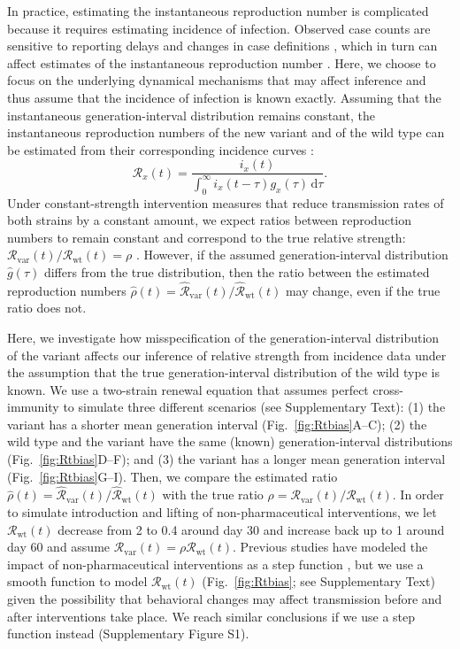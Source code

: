 \documentclass[12pt]{article}
\newcommand{\fref}[1]{Fig.~\ref{fig:#1}}
\newcommand{\vvvar}{\mathrm{var}}
\newcommand{\wwwt}{\mathrm{wt}}
\newcommand{\Rx}[1]{\ensuremath{{\mathcal R}_{#1}}\xspace}
\newcommand{\RR}{\ensuremath{{\mathcal R}}\xspace}
\newcommand{\Rw}{\Rx{\wwwt}}
\newcommand{\Rv}{\Rx{\vvvar}}
\newcommand{\dd}[1]{\ensuremath{\, \mathrm{d}#1}}
\newcommand{\dtau}{\dd{\tau}}
\begin{document}
In practice, estimating the instantaneous reproduction number is complicated because it requires estimating incidence of infection.
Observed case counts are sensitive to reporting delays \citep{goldstein2009reconstructing} and changes in case definitions \citep{tsang2020effect}, which in turn can affect estimates of the instantaneous reproduction number \citep{gostic2020practical}.
Here, we choose to focus on the underlying dynamical mechanisms that may affect inference and thus assume that the incidence of infection is known exactly.
Assuming that the instantaneous generation-interval distribution remains constant, the instantaneous reproduction numbers of the new variant and of the wild type can be estimated from their corresponding incidence curves \cite{cori2013new}:
\begin{equation}
\RR_x(t) = \frac{i_x(t)}{\int_0^\infty i_x(t-\tau) g_x(\tau) \dtau}.
\label{eq:rt}
\end{equation}
Under constant-strength intervention measures that reduce transmission rates of both strains by a constant amount, we expect ratios between reproduction numbers to remain constant and correspond to the true relative strength: $\Rv(t)/\Rw(t) = \rho$ \citep{leung2017monitoring,leung2020empirical,di2021impact,leung2021early}.
However, if the assumed generation-interval distribution $\hat{g}(\tau)$ differs from the true distribution, then the ratio between the estimated reproduction numbers $\hat{\rho}(t) = \hat{\RR}_{\textrm{var}}(t)/\hat{\RR}_{\textrm{wt}}(t)$ may change, even if the true ratio does not.

Here, we investigate how misspecification of the generation-interval distribution of the variant affects our inference of relative strength from incidence data under the assumption that the true generation-interval distribution of the wild type is known.
We use a two-strain renewal equation that assumes perfect cross-immunity to simulate three different scenarios (see Supplementary Text):
(1) the variant has a shorter mean generation interval (\fref{Rtbias}A--C);
(2) the wild type and the variant have the same (known) generation-interval distributions (\fref{Rtbias}D--F); and
(3) the variant has a longer mean generation interval (\fref{Rtbias}G--I).
Then, we compare the estimated ratio $\hat{\rho}(t) = \hat{\RR}_{\textrm{var}}(t)/\hat{\RR}_{\textrm{wt}}(t)$ with the true ratio $\rho = \Rv(t)/\Rw(t)$.
In order to simulate introduction and lifting of non-pharmaceutical interventions, we let $\Rw(t)$ decrease from 2 to 0.4 around day 30 and increase back up to 1 around day 60 and assume $\Rv(t) = \rho \Rw(t)$.
Previous studies have modeled the impact of non-pharmaceutical interventions as a step function \citep{flaxman2020Rt}, but we use a smooth function to model $\Rw(t)$ (\fref{Rtbias}; see Supplementary Text) given the possibility that behavioral changes may affect transmission before and after interventions take place.
We reach similar conclusions if we use a step function instead (Supplementary Figure S1).
\end{document}
